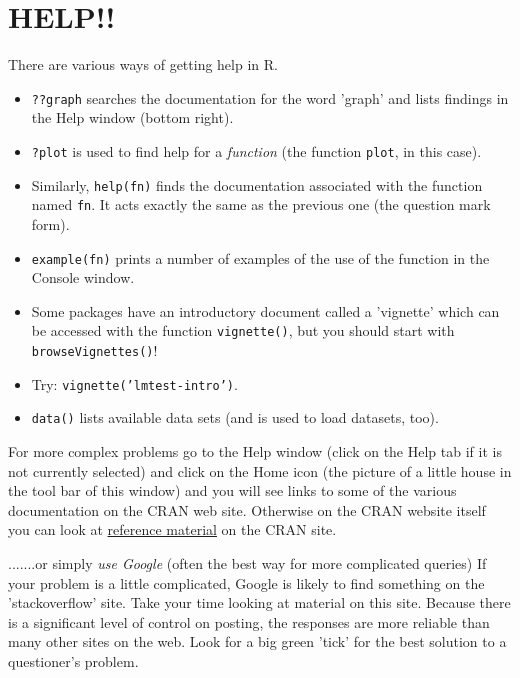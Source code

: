 \documentclass[titlepage]{book}\usepackage{knitr}
\begin{document}
\section{HELP!!}
There are various ways of getting help in R.
\begin{itemize}
\item{\texttt{??graph} searches the documentation for the word 'graph' and lists findings in the Help window (bottom right).}
\item{\texttt{?plot} is used to find help for a \emph{function} (the function \texttt{plot}, in this case). }
\item{Similarly, \texttt{help(fn)} finds the documentation associated with the function named \texttt{fn}. It acts exactly the same as the previous one (the question mark form).}

\item{\texttt{example(fn)}  prints a number of examples of the use of the function in the Console window.}
\item{Some packages have an introductory document called a 'vignette' which can be accessed with the function \texttt{vignette()}, but you should start with \texttt{browseVignettes()}!}
\item{Try: \texttt{vignette('lmtest-intro')}.}
\item{\texttt{data()} lists available data sets (and is used to load datasets, too).}
\end{itemize}

For more complex problems go to the Help window (click on the Help tab if it is not currently selected) and click on the Home icon (the picture of a little house in the tool bar of this window) and you will see links  to some of the various documentation on the CRAN web site.
Otherwise on the CRAN website itself you can look at \href{http://cran.r-project.org/doc/contrib/Torfs+Brauer-Short-R-Intro.pdf}{reference material} on the CRAN site.

.......or simply \emph{use Google} (often the best way for more complicated queries) If your problem is a little complicated, Google is likely to find something on the 'stackoverflow' site.  Take your time looking at material on this site.  Because there is a significant level of control on posting, the responses are more reliable than many other sites on the web. Look for a big green 'tick' for the best solution to a questioner's problem.
\end{document}

